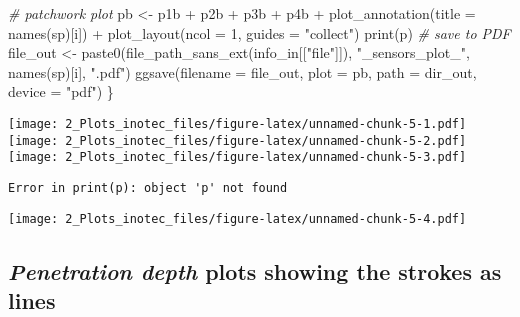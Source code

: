 \documentclass[
]{article}
\newenvironment{Shaded}{\begin{snugshade}}{\end{snugshade}}
\newcommand{\AttributeTok}[1]{\textcolor[rgb]{0.77,0.63,0.00}{#1}}
\newcommand{\CommentTok}[1]{\textcolor[rgb]{0.56,0.35,0.01}{\textit{#1}}}
\newcommand{\DecValTok}[1]{\textcolor[rgb]{0.00,0.00,0.81}{#1}}
\newcommand{\FunctionTok}[1]{\textcolor[rgb]{0.00,0.00,0.00}{#1}}
\newcommand{\NormalTok}[1]{#1}
\newcommand{\OtherTok}[1]{\textcolor[rgb]{0.56,0.35,0.01}{#1}}
\newcommand{\SpecialCharTok}[1]{\textcolor[rgb]{0.00,0.00,0.00}{#1}}
\newcommand{\StringTok}[1]{\textcolor[rgb]{0.31,0.60,0.02}{#1}}
\begin{document}
\begin{Shaded}
\begin{Highlighting}[]
  \CommentTok{\# patchwork plot}
\NormalTok{  pb }\OtherTok{\textless{}{-}}\NormalTok{ p1b }\SpecialCharTok{+}\NormalTok{ p2b }\SpecialCharTok{+}\NormalTok{ p3b }\SpecialCharTok{+}\NormalTok{ p4b }\SpecialCharTok{+} \FunctionTok{plot\_annotation}\NormalTok{(}\AttributeTok{title =} \FunctionTok{names}\NormalTok{(sp)[i]) }\SpecialCharTok{+} \FunctionTok{plot\_layout}\NormalTok{(}\AttributeTok{ncol =} \DecValTok{1}\NormalTok{, }\AttributeTok{guides =} \StringTok{"collect"}\NormalTok{)}
  \FunctionTok{print}\NormalTok{(p)}
  \CommentTok{\# save to PDF}
\NormalTok{  file\_out }\OtherTok{\textless{}{-}} \FunctionTok{paste0}\NormalTok{(}\FunctionTok{file\_path\_sans\_ext}\NormalTok{(info\_in[[}\StringTok{"file"}\NormalTok{]]), }\StringTok{"\_sensors\_plot\_"}\NormalTok{, }
                       \FunctionTok{names}\NormalTok{(sp)[i], }\StringTok{".pdf"}\NormalTok{)}
  \FunctionTok{ggsave}\NormalTok{(}\AttributeTok{filename =}\NormalTok{ file\_out, }\AttributeTok{plot =}\NormalTok{ pb, }\AttributeTok{path =}\NormalTok{ dir\_out, }\AttributeTok{device =} \StringTok{"pdf"}\NormalTok{)}
\NormalTok{\} }
\end{Highlighting}
\end{Shaded}

\texttt{[image: 2\_Plots\_inotec\_files/figure-latex/unnamed-chunk-5-1.pdf]}
\texttt{[image: 2\_Plots\_inotec\_files/figure-latex/unnamed-chunk-5-2.pdf]}
\texttt{[image: 2\_Plots\_inotec\_files/figure-latex/unnamed-chunk-5-3.pdf]}

\begin{verbatim}
Error in print(p): object 'p' not found
\end{verbatim}

\texttt{[image: 2\_Plots\_inotec\_files/figure-latex/unnamed-chunk-5-4.pdf]}

\hypertarget{penetration-depth-plots-showing-the-strokes-as-lines}{%
\subsection{\texorpdfstring{\emph{Penetration depth} plots showing the
strokes as
lines}{Penetration depth plots showing the strokes as lines}}\label{penetration-depth-plots-showing-the-strokes-as-lines}}
\end{document}
